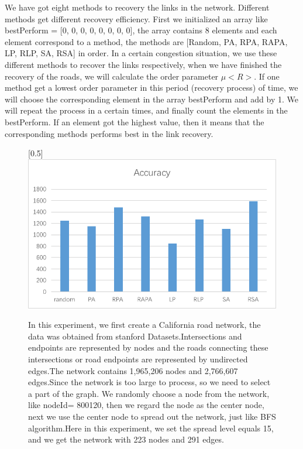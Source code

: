 \documentclass[onecolumn,preprintnumbers,amsmath,amssymb]{revtex4}
\begin{document}

We have got eight methods to recovery the links in the network. Different methods get different recovery efficiency. First we initialized an array like bestPerform = [0, 0, 0, 0, 0, 0, 0, 0], the array contains 8 elements and each element correspond to a method, the methods are [Random, PA, RPA, RAPA, LP, RLP, SA, RSA] in order. In a certain congestion  situation, we use these different methods to recover the links respectively, when we have finished the recovery of the roads, we will calculate the order parameter $\mu<R>$. If one method get a lowest order parameter in this period (recovery process) of time, we will choose the corresponding element in the array bestPerform and add by 1. We will repeat the process in a certain times, and finally count the elements in the  bestPerform. If an element got the highest value, then it means that the corresponding methods performs best in the link recovery.


\begin{figure}[ht]
\scalebox{0.5}[0.5]{\includegraphics[trim=0 10 0 0]{road.png}}
\caption{In this experiment, we first create a California road network, the data was obtained from stanford Datasets.Intersections and endpoints are represented by nodes and the roads connecting these intersections or road endpoints are represented by undirected edges.The network contains 1,965,206	 nodes and 2,766,607 edges.Since the network is too large to process, so we need to select a part of the graph. We randomly choose a node from the network, like nodeId= 800120, then we regard the node as the center node, next we use the center node to spread out the network, just like BFS algorithm.Here in this experiment, we set the spread level equals 15, and we get the network with 223 nodes and 291 edges.}\label{BAZD}
\end{figure}
\end{document}
